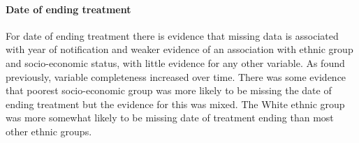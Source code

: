 \documentclass[11pt,twoside]{bristolthesis}
\begin{document}
  \hypertarget{date-of-ending-treatment}{%
  \paragraph{Date of ending treatment}\label{date-of-ending-treatment}}
  
  For date of ending treatment there is evidence that missing data is associated with year of notification and weaker evidence of an association with ethnic group and socio-economic status, with little evidence for any other variable. As found previously, variable completeness increased over time. There was some evidence that poorest socio-economic group was more likely to be missing the date of ending treatment but the evidence for this was mixed. The White ethnic group was more somewhat likely to be missing date of treatment ending than most other ethnic groups.
  
\end{document}
